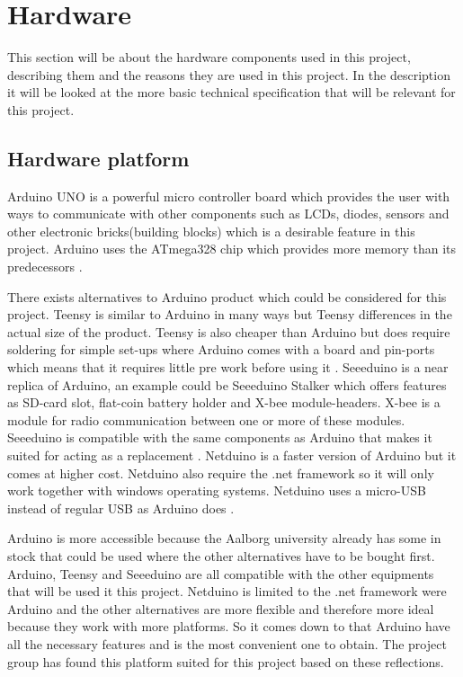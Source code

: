 \section{Hardware}
This section will be about the hardware components used in this project, describing them and the reasons they are used in this project. In the description it will be looked at the more basic technical specification that will be relevant for this project.

\subsection{Hardware platform}
Arduino UNO is a powerful micro controller board which provides the user with ways to communicate with other components such as LCDs, diodes, sensors and other electronic bricks(building blocks) which is a desirable feature in this project. Arduino uses the ATmega328 chip which provides more memory than its predecessors \citep{ArduinoUno}.

There exists alternatives to Arduino product which could be considered for this project. Teensy is similar to Arduino in many ways but Teensy differences in the actual size of the product. Teensy is also cheaper than Arduino but does require soldering for simple set-ups where Arduino comes with a board and pin-ports which means that it requires little pre work before using it \citep{Teensy}.
Seeeduino is a near replica of Arduino, an example could be Seeeduino Stalker which offers features as SD-card slot, flat-coin battery holder and X-bee module-headers. X-bee is a module for radio communication between one or more of these modules. Seeeduino is compatible with the same components as 
Arduino that makes it suited for acting as a replacement \citep{Seedui}.
Netduino is a faster version of Arduino but it comes at higher cost. Netduino also require the .net framework so it will only work together with windows operating systems. Netduino uses a micro-USB instead of regular USB as Arduino does \citep{Netdui}.

Arduino is more accessible because the Aalborg university already has some in stock that could be used where the other alternatives have to be bought first. Arduino, Teensy and Seeeduino are all compatible with the other equipments that will be used it this project. Netduino is limited to the .net framework were Arduino and the other alternatives are more flexible and therefore more ideal because they work with more platforms.
So it comes down to that Arduino have all the necessary features and is the most convenient one to obtain. The project group has found this platform suited for this project based on these reflections. 

